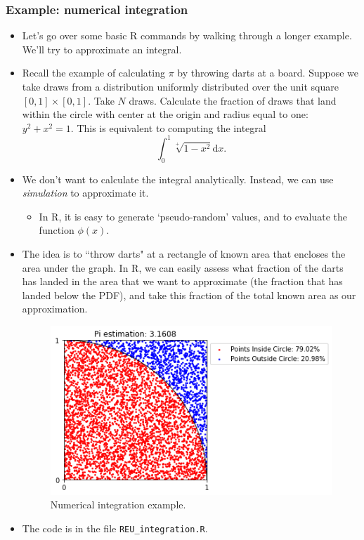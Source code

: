 \documentclass{beamer}
\begin{document}

\begin{frame}[allowframebreaks]
 \frametitle{Example: numerical integration}

	\begin{itemize}
		\item
		Let's go over some basic R commands by walking through a longer example. We'll try to approximate an integral.
		\item
		Recall the example of calculating $\pi$ by throwing darts at a board. Suppose
		we take draws from a distribution uniformly distributed over the unit square 
		$[0,1] \times [0,1]$. Take $N$ draws. Calculate the fraction of draws that land
		within the circle with center at the origin and radius equal to one: 
		$y^2 + x^2 = 1$. 
		This is 
		equivalent to computing the integral
		$$		
		\int_0^1 \sqrt[+]{1 - x^2} \mathrm d x.
		$$
		\item
		We don't want to calculate the integral analytically. Instead, we can use \textit{simulation} to approximate it.
		\begin{itemize}
			\item
			In R, it is easy to generate `pseudo-random' values, and to evaluate the function $\phi(x)$.
		\end{itemize}
		\item
		The idea is to ``throw darts" at a rectangle of known area that encloses the area under the graph. In R, we can easily assess what fraction of the darts has landed in the area that we want to approximate (the fraction that has landed below the PDF), and take this fraction of the total known area as our approximation.
		\begin{figure}
		\centering
		\includegraphics[width=.55\textwidth]{figures/fig3}
		\caption{\scriptsize Numerical integration example.}
		\label{Fig: 1}
		\end{figure}
		\item
		The code is in the file \texttt{\scriptsize REU\_integration.R}.
	\end{itemize}
	
\end{frame}
\end{document}
